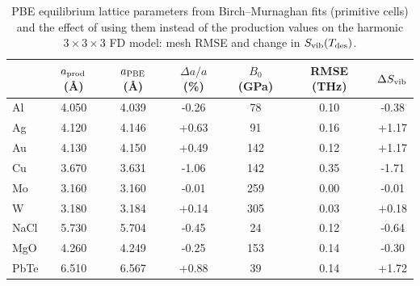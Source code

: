 \begin{table}[t]
\caption{PBE equilibrium lattice parameters from Birch--Murnaghan fits (primitive cells) and the effect of using them instead of the production values on the harmonic $3\times3\times3$ FD model: mesh RMSE and change in $S_{\rm vib}(T_{\rm des})$.}
\label{tab:volume}
\begin{ruledtabular}
\begin{tabular}{lcccccc}
 & $a_{\rm prod}$ (\AA) & $a_{\rm PBE}$ (\AA) & $\Delta a/a$ (\%) & $B_0$ (GPa) & RMSE (THz) & $\Delta S_{\rm vib}$\\
\hline
Al & 4.050 & 4.039 & -0.26 & 78 & 0.10 & -0.38\\
Ag & 4.120 & 4.146 & +0.63 & 91 & 0.16 & +1.17\\
Au & 4.130 & 4.150 & +0.49 & 142 & 0.12 & +1.17\\
Cu & 3.670 & 3.631 & -1.06 & 142 & 0.35 & -1.71\\
Mo & 3.160 & 3.160 & -0.01 & 259 & 0.00 & -0.01\\
W & 3.180 & 3.184 & +0.14 & 305 & 0.03 & +0.18\\
NaCl & 5.730 & 5.704 & -0.45 & 24 & 0.12 & -0.64\\
MgO & 4.260 & 4.249 & -0.25 & 153 & 0.14 & -0.30\\
PbTe & 6.510 & 6.567 & +0.88 & 39 & 0.14 & +1.72\\
\end{tabular}
\end{ruledtabular}
\end{table}
